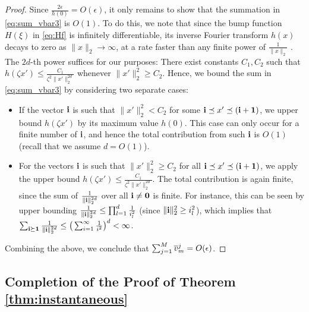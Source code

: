 \documentclass[english,onecolumn,final,11pt]{IEEEtran} %
\begin{document}
\begin{proof}
    Since $\frac{2\epsilon}{h(0)} = O(\epsilon)$, it only remains to show that the summation in \eqref{eq:sum_vbar3} is $O(1)$.  To do this, we note that since the bump function $H(\xi)$ in \eqref{eq:Hf} is infinitely differentiable, its inverse Fourier transform $h(x)$ decays to zero as $\|x\|_2 \to \infty$, at a rate faster than any finite power of $\frac{1}{\|x\|_2}$ \cite{Mea73}.  The $2d$-th power suffices for our purposes: There exist constants $C_1,C_2$ such that $h(\zeta x') \le \frac{C_1}{\zeta^2 \|x'\|_2^{2d}}$ whenever $\|x'\|_2^2 \ge C_2$.  Hence, we bound the sum in \eqref{eq:sum_vbar3} by considering two separate cases:
    \begin{itemize}
        \item If the vector $\mathbf{i}$ is such that $\|x'\|_2^2 < C_2$ for some $\mathbf{i} \preceq x' \preceq (\mathbf{i}+\mathbf{1})$, we upper bound $h(\zeta x')$ by its maximum value $h(0)$.  This case can only occur for a finite number of $\mathbf{i}$, and hence the total contribution from such $\mathbf{i}$ is $O(1)$ (recall that we assume $d = O(1)$).
        \item For the vectors $\mathbf{i}$ is such that $\|x'\|_2^2 \ge C_2$ for all $\mathbf{i} \preceq x' \preceq (\mathbf{i}+\mathbf{1})$, we apply the upper bound $h(\zeta x') \le \frac{C_1}{\zeta^2 \|x'\|_2^{2d}}$.  The total contribution is again finite, since the sum of $\frac{1}{\|\mathbf{i}\|_2^{2d}}$ over all $\mathbf{i} \ne \mathbf{0}$ is finite.  For instance, this can be seen by upper bounding $\frac{1}{\|\mathbf{i}\|_2^{2d}} \le \prod_{l=1}^d \frac{1}{i_l^2}$ (since $\|\mathbf{i}\|_2^2 \ge i_l^2$), which implies that $\sum_{\mathbf{i} \succeq \mathbf{1}} \frac{1}{\|\mathbf{i}\|_2^{2d}} \le \big(\sum_{i=1}^{\infty} \frac{1}{i^2}\big)^d < \infty$.
    \end{itemize}
    Combining the above, we conclude that $\sum_{j=1}^M \overline{v}_m^j = O(\epsilon)$.
\end{proof}


\subsection{Completion of the Proof of Theorem \ref{thm:instantaneous}} \label{sec:simple}

\end{document}
